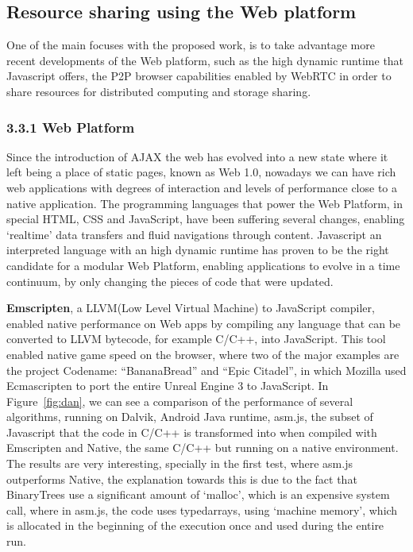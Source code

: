\documentclass{./llncs2e/llncs}
\begin{document}
% 
% 
\subsection{Resource sharing using the Web platform} 

One of the main focuses with the proposed work, is to take advantage more recent developments of the Web platform, such as the high dynamic runtime that Javascript offers, the P2P browser capabilities enabled by WebRTC\cite{Google} in order to share resources for distributed computing and storage sharing. 

\subsubsection{3.3.1 Web Platform}

Since the introduction of AJAX\cite{Google/Mozzila/Opera} the web has evolved into a new state where it left being a place of static pages, known as Web 1.0, nowadays we can have rich web applications with degrees of interaction and levels of performance close to a native application. The programming languages that power the Web Platform, in special HTML, CSS and JavaScript\cite{Ecma2009}, have been suffering several changes, enabling `realtime' data transfers and fluid navigations through content. Javascript an interpreted language with an  high dynamic runtime has proven to be the right candidate for a modular Web Platform, enabling applications to evolve in a time continuum, by only changing the pieces of code that were updated.

\textbf{Emscripten}\cite{Zakai2011}, a LLVM(Low Level Virtual Machine) to JavaScript compiler, enabled native performance on Web apps by compiling any language that can be converted to LLVM bytecode, for example C/C++, into JavaScript. This tool enabled native game speed on the browser, where two of the major examples are the project Codename: ``BananaBread''\cite{Mozilla2012} and ``Epic Citadel''\cite{Mozilla2013}, in which Mozilla used Ecmascripten to port the entire Unreal Engine 3 to JavaScript. In Figure~\ref{fig:dan}, we can see a comparison of the performance of several algorithms, running on Dalvik, Android Java runtime, asm.js, the subset of Javascript that the code in C/C++ is transformed into when compiled with Emscripten and Native, the same C/C++ but running on a native environment. The results are very interesting, specially in the first test, where asm.js outperforms Native, the explanation towards this is due to the fact that BinaryTrees use a significant amount of `malloc', which is an expensive system call, where in asm.js, the code uses typedarrays, using `machine memory', which is allocated in the beginning of the execution once and used during the entire run.
\end{document}
